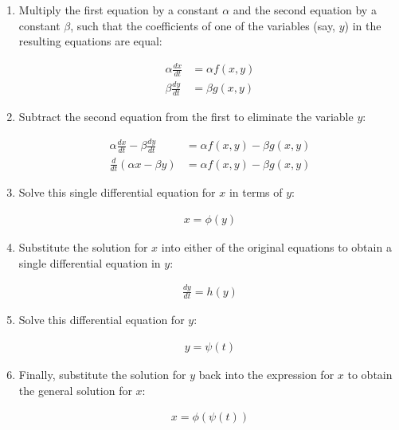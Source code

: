 \documentclass[a4paper,12pt]{article}
\begin{document}
\begin{enumerate}
    \item Multiply the first equation by a constant $\alpha$ and the second equation by a constant $\beta$, such that the coefficients of one of the variables (say, $y$) in the resulting equations are equal:
    
    \begin{align*}
        \alpha \frac{dx}{dt} &= \alpha f(x, y) \\
        \beta \frac{dy}{dt} &= \beta g(x, y)
    \end{align*}
    
    \item Subtract the second equation from the first to eliminate the variable $y$:
    
    \begin{align*}
        \alpha \frac{dx}{dt} - \beta \frac{dy}{dt} &= \alpha f(x, y) - \beta g(x, y) \\
        \frac{d}{dt}(\alpha x - \beta y) &= \alpha f(x, y) - \beta g(x, y)
    \end{align*}
    
    \item Solve this single differential equation for $x$ in terms of $y$:
    
    \begin{align*}
        x = \phi(y)
    \end{align*}
    
    \item Substitute the solution for $x$ into either of the original equations to obtain a single differential equation in $y$:
    
    \begin{align*}
        \frac{dy}{dt} = h(y)
    \end{align*}
    
    \item Solve this differential equation for $y$:
    
    \begin{align*}
        y = \psi(t)
    \end{align*}
    
    \item Finally, substitute the solution for $y$ back into the expression for $x$ to obtain the general solution for $x$:
    
    \begin{align*}
        x = \phi(\psi(t))
    \end{align*}
\end{enumerate}
\end{document}
